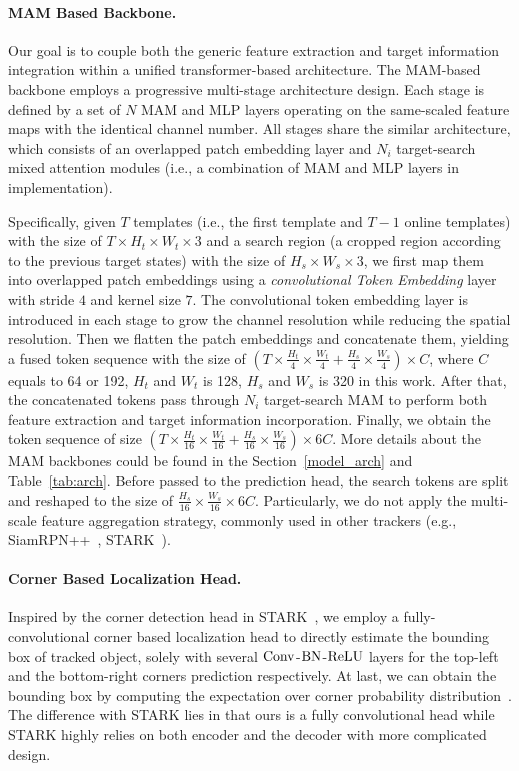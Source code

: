 \paragraph{MAM Based Backbone.}
Our goal is to couple both the generic feature extraction and target information integration within a unified transformer-based architecture. The MAM-based backbone employs a progressive multi-stage architecture design. Each stage is defined by a set of $N$ MAM and MLP layers operating on the same-scaled feature maps with the identical channel number. All stages share the similar architecture, which consists of an overlapped patch embedding layer and $N_i$ target-search mixed attention modules (i.e., a combination of MAM and MLP layers in implementation). 

Specifically, given $T$ templates (i.e., the first template and $T-1$ online templates) with the size of $T\times H_{t}\times{W_{t}}\times3$ and a search region (a cropped region according to the previous target states) with the size of $H_{s}\times{W_{s}}\times3$, we first map them into overlapped patch embeddings using a \emph{convolutional Token Embedding} layer with stride $4$ and kernel size $7$. 
The convolutional token embedding layer is introduced in each stage to grow the channel resolution while reducing the spatial resolution. 
Then we flatten the patch embeddings and concatenate them, yielding a fused token sequence with the size of $(T\times\frac{H_{t}}{4}\times\frac{W_t}{4}+\frac{H_s}{4}\times\frac{W_s}{4})\times C$, where $C$ equals to 64 or 192, $H_t$ and $W_t$ is 128, $H_s$ and $W_s$ is 320 in this work. 
After that, the concatenated tokens pass through $N_i$ target-search MAM to perform both feature extraction and target information incorporation. 
Finally, we obtain the token sequence of size $(T\times\frac{H_{t}}{16}\times\frac{W_t}{16}+\frac{H_s}{16}\times\frac{W_s}{16})\times6C$. More details about the MAM backbones could be found in the Section~\ref{model_arch} and Table~\ref{tab:arch}.
Before passed to the prediction head, the search tokens are split and reshaped to the size of $\frac{H_{s}}{16}\times\frac{W_s}{16}\times6C$. 
Particularly, we do not apply the multi-scale feature aggregation strategy, commonly used in other trackers (e.g., SiamRPN++~\cite{siamrpnPlus}, STARK~\cite{stark}).
\vspace{-3mm}
\paragraph{Corner Based Localization Head.}\label{corner_head}
Inspired by the corner detection head in STARK~\cite{stark}, we employ a fully-convolutional corner based localization head to directly estimate the bounding box of tracked object, solely with several $\rm Conv$-$\rm BN$-$\rm ReLU$ layers for the top-left and the bottom-right corners prediction respectively. At last, we can obtain the bounding box by computing the expectation over corner probability distribution~\cite{GFloss}. The difference with STARK lies in that ours is a fully convolutional head while STARK highly relies on both encoder and the decoder with more complicated design.
\vspace{-3mm}
